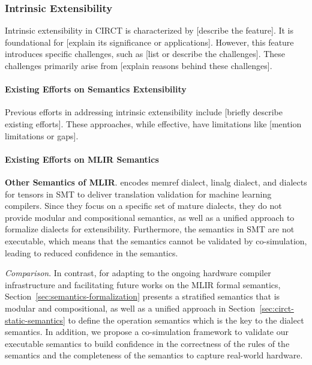 \subsubsection{Intrinsic Extensibility}
Intrinsic extensibility in CIRCT is characterized by [describe the feature]. It is foundational for [explain its significance or applications].
However, this feature introduces specific challenges, such as [list or describe the challenges]. These challenges primarily arise from [explain reasons behind these challenges].

\paragraph{Existing Efforts on Semantics Extensibility}
Previous efforts in addressing intrinsic extensibility include [briefly describe existing efforts]. These approaches, while effective, have limitations like [mention limitations or gaps].

\paragraph{Existing Efforts on MLIR Semantics}

 \textbf{Other Semantics of MLIR}. \citet{bangSMTBasedTranslationValidation2022} encodes memref dialect, linalg dialect, and dialects for tensors in SMT to deliver translation validation for machine learning compilers. Since they focus on a specific set of mature dialects, they do not provide modular and compositional semantics, as well as a unified approach to formalize dialects for extensibility. Furthermore, the semantics in SMT are not executable, which means that the semantics cannot be validated by co-simulation, leading to reduced confidence in the semantics. 

 \textit{Comparison}. In contrast, for adapting to the ongoing hardware compiler infrastructure and facilitating future works on the MLIR formal semantics, Section~\ref{sec:semantics-formalization} presents a stratified semantics that is modular and compositional, as well as a unified approach in Section~\ref{sec:circt-static-semantics} to define the operation semantics which is the key to the dialect semantics. In addition, we propose a co-simulation framework to validate our executable semantics to build confidence in the correctness of the rules of the semantics and the completeness of the semantics to capture real-world hardware.


